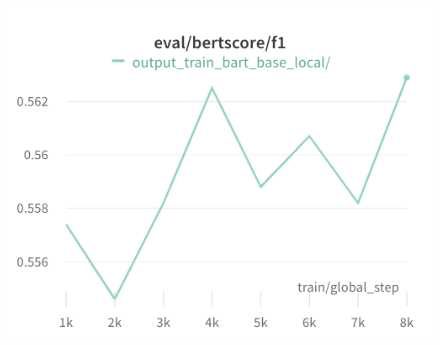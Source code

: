 \documentclass{article}
\begin{document}
\begin{figure}[!htb]
\includegraphics[width=\linewidth]{charts/Section-2-Panel-2-n99sw9rfp}
\caption{}
\endminipage
\end{figure}
\end{document}
